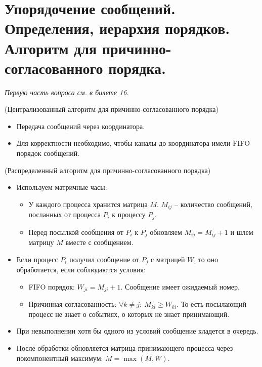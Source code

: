 \section{Упорядочение сообщений. Определения, иерархия порядков. Алгоритм для причинно-согласованного порядка.}

\textit{Первую часть вопроса см. в билете 16.}

\begin{algorithm}(Централизованный алгоритм для причинно-согласованного порядка)

    \begin{itemize}
        \item Передача сообщений через координатора.
        \item Для корректности необходимо, чтобы каналы до координатора имели FIFO порядок сообщений.
    \end{itemize}
\end{algorithm}

\begin{algorithm}(Распределенный алгоритм для причинно-согласованного порядка)

    \begin{itemize}
        \item Используем матричные часы:
        \begin{itemize}
            \item У каждого процесса хранится матрица $M$. $M_{ij}$ -- количество сообщений, посланных от процесса $P_i$ к процессу $P_j$.
            \item Перед посылкой сообщения от $P_i$ к $P_j$ обновляем $M_{ij} = M_{ij} + 1$ и шлем матрицу $M$ вместе с сообщением.
        \end{itemize}
        \item Если процесс $P_i$ получил сообщение от $P_j$ с матрицей $W$, то оно обработается, если соблюдаются условия:
        \begin{itemize}
            \item FIFO порядок: $W_{ji} = M_{ji} + 1$. Сообщение имеет ожидаемый номер.
            \item Причинная согласованность: $\forall k \not = j \colon~ M_{ki} \geqslant W_{ki}$. То есть посылающий процесс не знает о событиях, о которых не знает принимающий.
        \end{itemize}
        \item При невыполнении хотя бы одного из условий сообщение кладется в очередь.
        \item После обработки обновляется матрица принимающего процесса через покомпонентный максимум: $M = \max{(M, W)}$.
    \end{itemize}

\end{algorithm}
